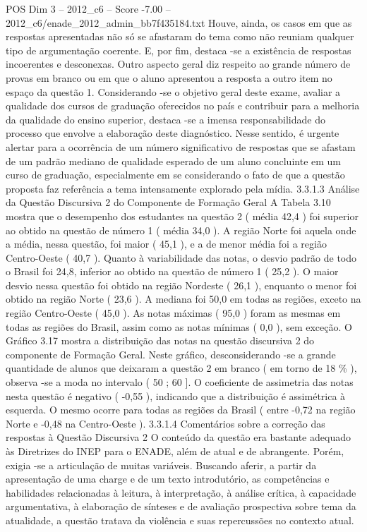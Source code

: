 \begin{textsample}{POS Dim 3 – 2012\_c6 – Score -7.00 – 2012\_c6/enade\_2012\_admin\_bb7f435184.txt}
Houve, ainda, os casos em que as respostas apresentadas não só se afastaram do tema como não reuniam qualquer tipo de argumentação coerente.
E, por fim, destaca -se a existência de respostas incoerentes e desconexas.
Outro aspecto geral diz respeito ao grande número de provas em branco ou em que o aluno apresentou a resposta a outro item no espaço da questão 1.
Considerando -se o objetivo geral deste exame, avaliar a qualidade dos cursos de graduação oferecidos no país e contribuir para a melhoria da qualidade do ensino superior, destaca -se a imensa responsabilidade do processo que envolve a elaboração deste diagnóstico.
Nesse sentido, é urgente alertar para a ocorrência de um número significativo de respostas que se afastam de um padrão mediano de qualidade esperado de um aluno concluinte em um curso de graduação, especialmente em se considerando o fato de que a questão proposta faz referência a tema intensamente explorado pela mídia. 3.3.1.3 Análise da Questão Discursiva 2 do Componente de Formação Geral A Tabela 3.10 mostra que o desempenho dos estudantes na questão 2 ( média 42,4 ) foi superior ao obtido na questão de número 1 ( média 34,0 ).
A região Norte foi aquela onde a média, nessa questão, foi maior ( 45,1 ), e a de menor média foi a região Centro-Oeste ( 40,7 ).
Quanto à variabilidade das notas, o desvio padrão de todo o Brasil foi 24,8, inferior ao obtido na questão de número 1 ( 25,2 ).
O maior desvio nessa questão foi obtido na região Nordeste ( 26,1 ), enquanto o menor foi obtido na região Norte ( 23,6 ).
A mediana foi 50,0 em todas as regiões, exceto na região Centro-Oeste ( 45,0 ).
As notas máximas ( 95,0 ) foram as mesmas em todas as regiões do Brasil, assim como as notas mínimas ( 0,0 ), sem exceção.
O Gráfico 3.17 mostra a distribuição das notas na questão discursiva 2 do componente de Formação Geral.
Neste gráfico, desconsiderando -se a grande quantidade de alunos que deixaram a questão 2 em branco ( em torno de 18 \% ), observa -se a moda no intervalo ( 50 ; 60 ].
O coeficiente de assimetria das notas nesta questão é negativo ( -0,55 ), indicando que a distribuição é assimétrica à esquerda.
O mesmo ocorre para todas as regiões da Brasil ( entre -0,72 na região Norte e -0,48 na Centro-Oeste ). 3.3.1.4 Comentários sobre a correção das respostas à Questão Discursiva 2 O conteúdo da questão era bastante adequado às Diretrizes do INEP para o ENADE, além de atual e de abrangente.
Porém, exigia -se a articulação de muitas variáveis.
Buscando aferir, a partir da apresentação de uma charge e de um texto introdutório, as competências e habilidades relacionadas à leitura, à interpretação, à análise crítica, à capacidade argumentativa, à elaboração de sínteses e de avaliação prospectiva sobre tema da atualidade, a questão tratava da violência e suas repercussões no contexto atual.

\end{textsample}
